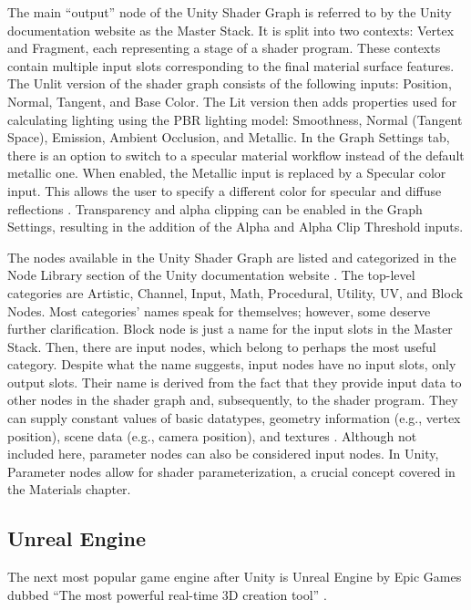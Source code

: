 \documentclass[
  digital,     %
  oneside,     %
  nosansbold,  %
  nocolorbold, %
  lof,         %
  lot,         %
]{fithesis4}
\begin{document}
The main \enquote{output} node of the Unity Shader Graph is referred to by the Unity documentation website
\cite{unity-master-stack} as the Master Stack. It is split into two contexts: Vertex and Fragment,
each representing a stage of a shader program. These contexts contain multiple input slots corresponding
to the final material surface features. The Unlit version of the shader graph consists of the following
inputs: Position, Normal, Tangent, and Base Color. The Lit version then adds properties used for
calculating lighting using the PBR lighting model: Smoothness, Normal (Tangent Space),
Emission, Ambient Occlusion, and Metallic. In the Graph Settings tab, there is an option to switch to a specular material workflow
instead of the default metallic one. When enabled, the Metallic input is replaced by a Specular color input. This allows
the user to specify a different color for specular and diffuse reflections \cite{unity-metallic-specular}.
Transparency and alpha clipping can be enabled in the Graph Settings,
resulting in the addition of the Alpha and Alpha Clip Threshold inputs.

The nodes available in the Unity Shader Graph are listed and categorized in the Node Library section
of the Unity documentation website \cite{unity-node-library}. The top-level categories are Artistic, Channel, Input,
Math, Procedural, Utility, UV, and Block Nodes. Most categories' names speak for themselves; however, some deserve
further clarification. Block node is just a name for the input slots in the Master Stack. Then, there are input nodes,
which belong to perhaps the most useful category. Despite what the name suggests,
input nodes have no input slots, only output slots. Their name is derived from the fact that
they provide input data to other nodes in the shader graph and, subsequently,
to the shader program. They can supply constant values of basic datatypes,
geometry information (e.g., vertex position), scene data (e.g., camera position), and textures \cite{unity-input-nodes}.
Although not included here, parameter nodes can also be considered input nodes.
In Unity, Parameter nodes allow for shader parameterization, a crucial concept covered in the Materials chapter.

\subsection{Unreal Engine}
The next most popular game engine after Unity is Unreal Engine by Epic Games \cite{slashdata-game-engines} dubbed \enquote{The most
powerful real-time 3D creation tool} \cite{ue}.
\end{document}
